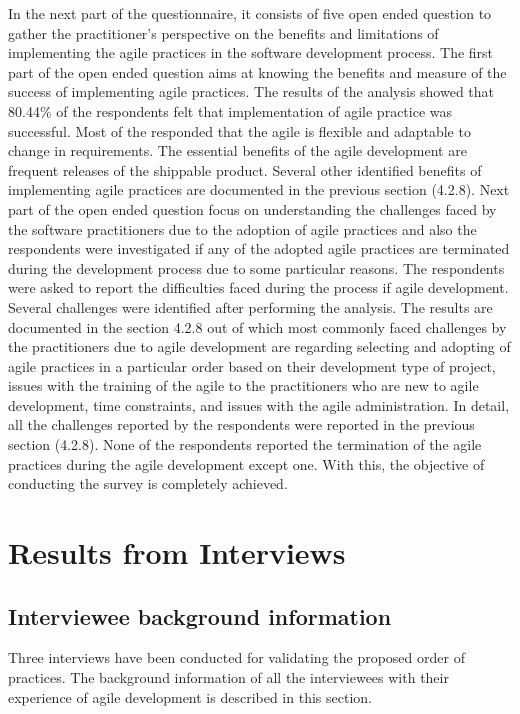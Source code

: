 \documentclass[a4paper,oneside]{bth}
\begin{document}
In the next part of the questionnaire, it consists of five open ended question to gather the practitioner’s perspective on the benefits and limitations of implementing the agile practices in the software development process. The first part of the open ended question aims at knowing the benefits and measure of the success of implementing agile practices. The results of the analysis showed that 80.44\% of the respondents felt that implementation of agile practice was successful. Most of the responded that the agile is flexible and adaptable to change in requirements. The essential benefits of the agile development are frequent releases of the shippable product. Several other identified benefits of implementing agile practices are documented in the previous section (4.2.8).
Next part of the open ended question focus on understanding the challenges faced by the software practitioners due to the adoption of agile practices and also the respondents were investigated if any of the adopted agile practices are terminated during the development process due to some particular reasons. The respondents were asked to report the difficulties faced during the process if agile development. Several challenges were identified after performing the analysis. The results are documented in the section 4.2.8 out of which most commonly faced challenges by the practitioners due to agile development are regarding selecting and adopting of agile practices in a particular order based on their development type of project, issues with the training of the agile to the practitioners who are new to agile development, time constraints, and issues with the agile administration. In detail, all the challenges reported by the respondents were reported in the previous section (4.2.8). None of the respondents reported the termination of the agile practices during the agile development except one. With this, the objective of conducting the survey is completely achieved. 


\section{Results from Interviews}
\subsection{Interviewee background information}
Three interviews have been conducted for validating the proposed order of practices. The background information of all the interviewees with their experience of agile development is described in this section.
\end{document}
